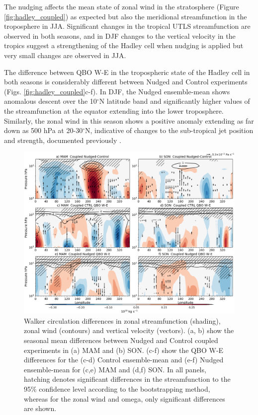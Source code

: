 The nudging affects the mean state of zonal wind in the stratosphere (Figure \ref{fig:hadley_coupled}) as expected but also the meridional streamfunction in the troposphere in JJA. Significant changes in the tropical UTLS streamfunction are observed in both seasons, and in DJF changes to the vertical velocity in the tropics suggest a strengthening of the Hadley cell when nudging is applied but very small changes are observed in JJA. 

The difference between QBO W-E in the tropospheric state of the Hadley cell in both seasons is considerably different between Nudged and Control experiments (Figs. \ref{fig:hadley_coupled}c-f). 
In DJF, the Nudged ensemble-mean shows anomalous descent over the 10$^\circ$N latitude band and significantly higher values of the streamfunction at the equator extending into the lower troposphere. Similarly, the zonal wind in this season shows a positive anomaly extending as far down as 500 hPa at 20-30$^\circ$N, indicative of changes to the sub-tropical jet position and strength, documented previously \citep[e.g.][]{garfinkel2010}.

\begin{figure}[t!]
\centering
 \includegraphics[width=\linewidth]{figures/suite_coupledwalker.png}
\caption[Walker circulation in coupled nudged experiments.]{Walker circulation differences in zonal streamfunction (shading), zonal wind (contours) and vertical velocity (vectors). (a, b) show the seasonal mean differences between Nudged and Control coupled experiments in (a) MAM and (b) SON. (c-f) show the QBO W-E differences for the (c-d) Control ensemble-mean and (e-f) Nudged  ensemble-mean for (c,e) MAM and (d,f) SON. In all panels, hatching denotes significant differences in the streamfunction to the 95\% confidence level according to the bootstrapping method, whereas for the zonal wind and omega, only significant differences are shown.}
\label{fig:walker_coupled}
\end{figure}


